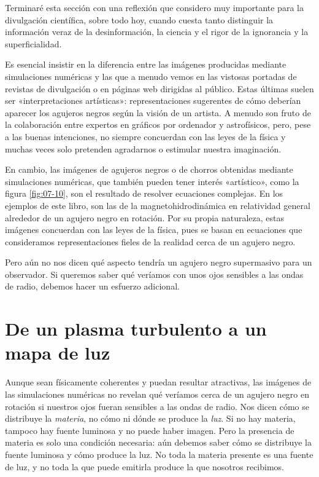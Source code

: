 Terminaré esta sección con una reflexión que considero muy importante para la divulgación científica, sobre todo hoy, cuando cuesta tanto distinguir la información veraz de la desinformación, la ciencia y el rigor de la ignorancia y la superficialidad.

Es esencial insistir en la diferencia entre las imágenes producidas mediante simulaciones numéricas y las que a menudo vemos en las vistosas portadas de revistas de divulgación o en páginas web dirigidas al público. Estas últimas suelen ser «interpretaciones artísticas»: representaciones sugerentes de cómo deberían aparecer los agujeros negros según la visión de un artista. A menudo son fruto de la colaboración entre expertos en gráficos por ordenador y astrofísicos, pero, pese a las buenas intenciones, no siempre concuerdan con las leyes de la física y muchas veces solo pretenden agradarnos o estimular nuestra imaginación.

En cambio, las imágenes de agujeros negros o de chorros obtenidas mediante simulaciones numéricas, que también pueden tener interés «artístico», como la figura \ref{fig:07-10}, son el resultado de resolver ecuaciones complejas. En los ejemplos de este libro, son las de la magnetohidrodinámica en relatividad general alrededor de un agujero negro en rotación. Por su propia naturaleza, estas imágenes concuerdan con las leyes de la física, pues se basan en ecuaciones que consideramos representaciones fieles de la realidad cerca de un agujero negro.

Pero aún no nos dicen qué aspecto tendría un agujero negro supermasivo para un observador. Si queremos saber qué veríamos con unos ojos sensibles a las ondas de radio, debemos hacer un esfuerzo adicional.

\section[De un plasma turbulento a un mapa de luz]{De un plasma turbulento a un mapa de luz}\label{sec:07-map}

Aunque sean físicamente coherentes y puedan resultar atractivas, las imágenes de las simulaciones numéricas no revelan qué veríamos cerca de un agujero negro en rotación si nuestros ojos fueran sensibles a las ondas de radio. Nos dicen cómo se distribuye la \emph{materia}, no cómo ni dónde se produce la \emph{luz}. Si no hay materia, tampoco hay fuente luminosa y no puede haber imagen. Pero la presencia de materia es solo una condición necesaria: aún debemos saber cómo se distribuye la fuente luminosa y cómo produce la luz. No toda la materia presente es una fuente de luz, y no toda la que puede emitirla produce la que nosotros recibimos.

